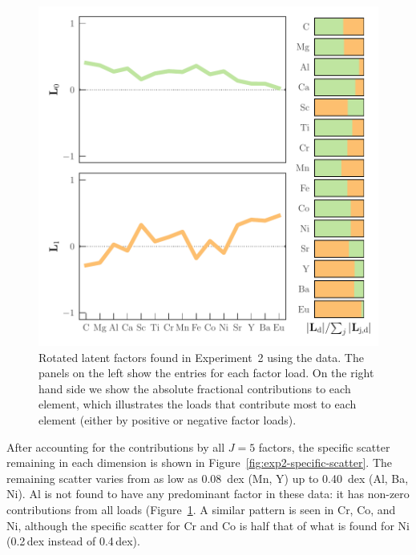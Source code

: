 \documentclass[twocolumn]{aastex62}
\begin{document}
\begin{figure}
	\includegraphics[width=\textwidth]{experiments/exp2-latent-factors-visualize.pdf}
	\caption{Rotated latent factors found in Experiment~2 using the \citet{Barklem:2005}
			 data. The panels on the left show the entries for each factor load. On
			 the right hand side we show the absolute fractional contributions to
			 each element, which illustrates the loads that contribute most to each
			 element (either by positive or negative factor loads).}
    \label{fig:exp2-factor-loads}
\end{figure}



After accounting for the contributions by all
$J = 5$ factors, the specific scatter remaining in each dimension is shown in
Figure~\ref{fig:exp2-specific-scatter}. The remaining scatter varies from as low 
as 0.08~dex (Mn, Y) up to 0.40~dex (Al, Ba, Ni). Al is not found to have any 
predominant factor in these data: it has non-zero contributions from all loads
(Figure~\ref{fig:exp2-factor-loads}. A similar pattern is seen in Cr, Co, and Ni,
although the specific scatter for Cr and Co is half that of what is found for
Ni (0.2\,dex instead of 0.4\,dex).

\end{document}
